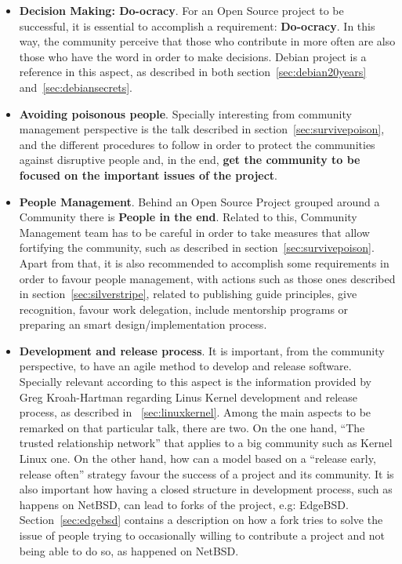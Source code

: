 \documentclass[11pt]{article}
\begin{document}
\begin{itemize}
\begin{itemize}
\item{\textbf{Decision Making: Do-ocracy}}. For an Open Source project to be successful, it is essential to accomplish a requirement: \textbf{Do-ocracy}. In this way, the community perceive that those who contribute in more often are also those who have the word in order to make decisions. Debian project is a reference in this aspect, as described in both section~\ref{sec:debian20years} and~\ref{sec:debiansecrets}. 
\item{\textbf{Avoiding poisonous people}}. Specially interesting from community management perspective is the talk described in section~\ref{sec:survivepoison}, and the different procedures to follow in order to protect the communities against disruptive people and, in the end, \textbf{get the community to be focused on the important issues of the project}.
\item{\textbf{People Management}}. Behind an Open Source Project grouped around a Community there is \textbf{People in the end}. Related to this, Community Management team has to be careful in order to take measures that allow fortifying the community, such as described in section~\ref{sec:survivepoison}. Apart from that, it is also recommended to accomplish some requirements in order to favour people management, with actions such as those ones described in section~\ref{sec:silverstripe}, related to publishing guide principles, give recognition, favour work delegation, include mentorship programs or preparing an smart design/implementation process.
\item{\textbf{Development and release process}}. It is important, from the community perspective, to have an agile method to develop and release software. Specially relevant according to this aspect is the information provided by Greg Kroah-Hartman regarding Linus Kernel development and release process, as described in ~\ref{sec:linuxkernel}. Among the main aspects to be remarked on that particular talk, there are two. On the one hand, ``The trusted relationship network'' that applies to a big community such as Kernel Linux one. On the other hand, how can a model based on a ``release early, release often'' strategy favour the success of a project and its community. It is also important how having a closed structure in development process, such as happens on NetBSD, can lead to forks of the project, e.g: EdgeBSD. Section~\ref{sec:edgebsd} contains a description on how a fork tries to solve the issue of people trying to occasionally willing to contribute a project and not being able to do so, as happened on NetBSD.

\end{itemize}
\end{itemize}
\end{document}
